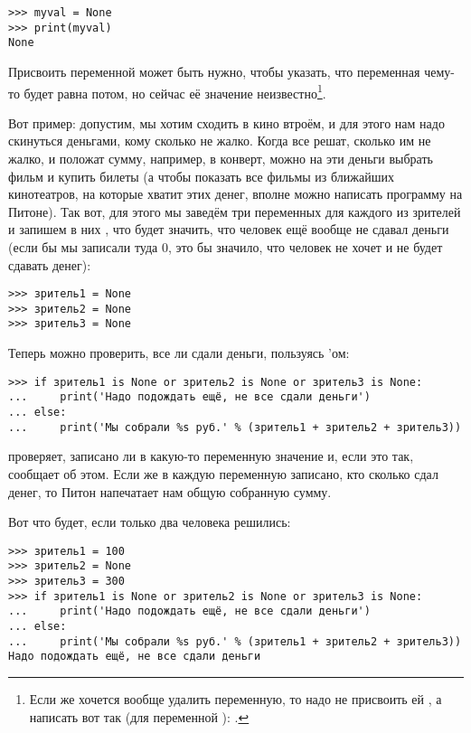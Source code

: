 \begin{listing}
\begin{verbatim}
>>> myval = None
>>> print(myval)
None
\end{verbatim}
\end{listing}

Присвоить переменной  может быть нужно, чтобы указать, что переменная чему-то будет равна потом, но сейчас её значение неизвестно\footnote{Если же хочется вообще удалить переменную, то надо не присвоить ей , а написать вот так (для переменной ): .}.

Вот пример: допустим, мы хотим сходить в кино втроём, и для этого нам надо скинуться деньгами, кому сколько не жалко. Когда все решат, сколько им не жалко, и положат сумму, например, в конверт, можно на эти деньги выбрать фильм и купить билеты (а чтобы показать все фильмы из ближайших кинотеатров, на которые хватит этих денег, вполне можно написать программу на Питоне). Так вот, для этого мы заведём три переменных для каждого из зрителей и запишем в них , что будет значить, что человек ещё вообще не сдавал деньги (если бы мы записали туда 0, это бы значило, что человек не хочет и не будет сдавать денег):

\begin{listing}
\begin{verbatim}
>>> зритель1 = None
>>> зритель2 = None
>>> зритель3 = None
\end{verbatim}
\end{listing}

Теперь можно проверить, все ли сдали деньги, пользуясь 'ом:

\begin{listing}
\begin{verbatim}
>>> if зритель1 is None or зритель2 is None or зритель3 is None:
...     print('Надо подождать ещё, не все сдали деньги')
... else:
...     print('Мы собрали %s руб.' % (зритель1 + зритель2 + зритель3))
\end{verbatim}
\end{listing}

 проверяет, записано ли в какую-то переменную значение  и, если это так, сообщает об этом. Если же в каждую переменную записано, кто сколько сдал денег, то Питон напечатает нам общую собранную сумму.

Вот что будет, если только два человека решились:

\begin{listing}
\begin{verbatim}
>>> зритель1 = 100
>>> зритель2 = None
>>> зритель3 = 300
>>> if зритель1 is None or зритель2 is None or зритель3 is None:
...     print('Надо подождать ещё, не все сдали деньги')
... else:
...     print('Мы собрали %s руб.' % (зритель1 + зритель2 + зритель3))
Надо подождать ещё, не все сдали деньги
\end{verbatim}
\end{listing}

